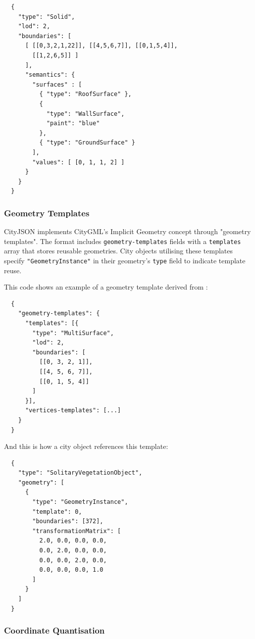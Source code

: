 \begin{lstlisting}
  {
    "type": "Solid",
    "lod": 2,
    "boundaries": [
      [ [[0,3,2,1,22]], [[4,5,6,7]], [[0,1,5,4]],
        [[1,2,6,5]] ]
      ],
      "semantics": {
        "surfaces" : [
          { "type": "RoofSurface" },
          {
            "type": "WallSurface",
            "paint": "blue"
          },
          { "type": "GroundSurface" }
        ],
        "values": [ [0, 1, 1, 2] ]
      }
    }
  }
\end{lstlisting}

\subsubsection{Geometry Templates}
\label{rw:cityjson:geometry_templates}

CityJSON implements CityGML's Implicit Geometry concept through "geometry templates". The format includes \texttt{geometry-templates} fields with a \texttt{templates} array that stores reusable geometries. City objects utilising these templates specify \texttt{"GeometryInstance"} in their geometry's \texttt{type} field to indicate template reuse.

This code shows an example of a geometry template derived from \citet{ledoux_2019}:

\begin{lstlisting}
  {
    "geometry-templates": {
      "templates": [{
        "type": "MultiSurface",
        "lod": 2,
        "boundaries": [
          [[0, 3, 2, 1]],
          [[4, 5, 6, 7]],
          [[0, 1, 5, 4]]
        ]
      }],
      "vertices-templates": [...]
    }
  }
\end{lstlisting}

And this is how a city object references this template:

\begin{lstlisting}
  {
    "type": "SolitaryVegetationObject",
    "geometry": [
      {
        "type": "GeometryInstance",
        "template": 0,
        "boundaries": [372],
        "transformationMatrix": [
          2.0, 0.0, 0.0, 0.0,
          0.0, 2.0, 0.0, 0.0,
          0.0, 0.0, 2.0, 0.0,
          0.0, 0.0, 0.0, 1.0
        ]
      }
    ]
  }
\end{lstlisting}

\subsubsection{Coordinate Quantisation}
\label{rw:cityjson:coordinate_quantisation}

